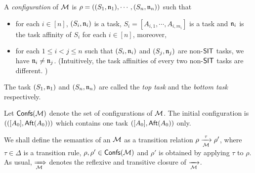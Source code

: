 A \emph{configuration} of ${\mathcal{M} }$ is $\rho = ((S_1,\mathfrak{n}_1), \cdots, (S_n,\mathfrak{n}_n))$ such that
\begin{itemize}
\item for each $i \in [n]$, $(S_i,\mathfrak{n}_i)$ is a task, $S_i = [A_{i,1}, \cdots, A_{i, m_i}]$ is a task and $\mathfrak{n}_i$ is the task affinity of $S_i$ for each $i \in [n]$, moreover, 
%
\item for each $1 \le i < j \le n$ such that $(S_i, \mathfrak{n}_i)$ and $(S_j, \mathfrak{n}_j)$ are non-$\mathsf{SIT}$ tasks,  we have $ \mathfrak{n}_i \neq \mathfrak{n}_j$.  (Intuitively, the task affinities of every two non-$\mathsf{SIT}$ tasks are different. )
\end{itemize}
The task $(S_1,\mathfrak{n}_1)$ and $(S_n,\mathfrak{n}_n)$ are called the \emph{top task} and the \emph{bottom task} respectively. 


Let ${\mathsf{Confs} }({\mathcal{M} })$ denote the set of configurations of ${\mathcal{M} }$.
The initial configuration is $(([A_0],{\sf Aft}(A_0)))$ which contains one task $([A_0], {\sf Aft}(A_0))$ only. 


We shall define the semantics of an {\AMASS} ${\mathcal{M} }$ as a transition relation $\rho \xrightarrow[{\mathcal{M} }]{\tau} \rho'$, where $\tau \in \Delta$ is a transition rule, $\rho, \rho' \in {\mathsf{Confs} }({\mathcal{M} })$ and $\rho'$ is obtained by applying $\tau$ to $\rho$. As usual, $\xRightarrow[{\mathcal{M} }]{}$ denotes the reflexive and transitive closure of $\xrightarrow[{\mathcal{M} }]{}$.




